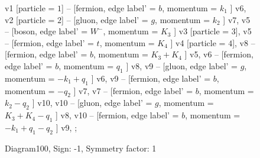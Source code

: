 \documentclass{revtex4}
\begin{document}
\begin{figure}[!htb]
\begin{center}
{    %
v1 [particle = \(1\)] -- [fermion, edge label' = \(b\), momentum = \(k_{1}\) ] v6, 
v2 [particle = \(2\)] -- [gluon, edge label' = \(g\), momentum = \(k_{2}\) ] v7, 
v5 -- [boson, edge label' = \(W^{-}\), momentum = \(K_{3}\) ] v3 [particle = \(3\)], 
v5 -- [fermion, edge label' = \(t\), momentum = \(K_{4}\) ] v4 [particle = \(4\)], 
v8 -- [fermion, edge label' = \(b\), momentum = \(K_{3} + K_{4}\) ] v5, 
v6 -- [fermion, edge label' = \(b\), momentum = \(q_{1}\) ] v8, 
v9 -- [gluon, edge label' = \(g\), momentum = \(-k_{1} + q_{1}\) ] v6, 
v9 -- [fermion, edge label' = \(b\), momentum = \(-q_{2}\) ] v7, 
v7 -- [fermion, edge label' = \(b\), momentum = \(k_{2} - q_{2}\) ] v10, 
v10 -- [gluon, edge label' = \(g\), momentum = \(K_{3} + K_{4} - q_{1}\) ] v8, 
v10 -- [fermion, edge label' = \(b\), momentum = \(-k_{1} + q_{1} - q_{2}\) ] v9, 
};
\end{center}
\caption{Diagram100, Sign: -1, Symmetry factor: 1}
\end{figure}
\newpage
\end{document}
